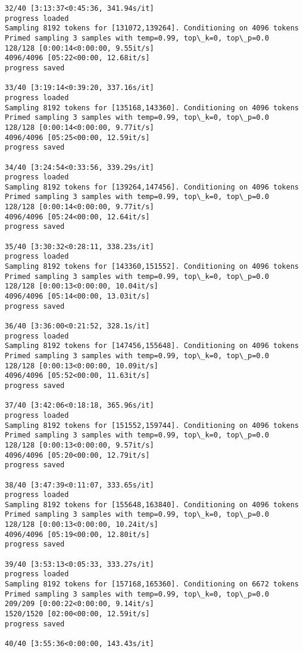 \documentclass[11pt]{article}
\begin{document}
\begin{Verbatim}[commandchars=\\\{\}]
32/40 [3:13:37<0:45:36, 341.94s/it]
progress loaded
Sampling 8192 tokens for [131072,139264]. Conditioning on 4096 tokens
Primed sampling 3 samples with temp=0.99, top\_k=0, top\_p=0.0
128/128 [0:00:14<0:00:00, 9.55it/s]
4096/4096 [05:22<00:00, 12.68it/s]
progress saved

33/40 [3:19:14<0:39:20, 337.16s/it]
progress loaded
Sampling 8192 tokens for [135168,143360]. Conditioning on 4096 tokens
Primed sampling 3 samples with temp=0.99, top\_k=0, top\_p=0.0
128/128 [0:00:14<0:00:00, 9.77it/s]
4096/4096 [05:25<00:00, 12.59it/s]
progress saved

34/40 [3:24:54<0:33:56, 339.29s/it]
progress loaded
Sampling 8192 tokens for [139264,147456]. Conditioning on 4096 tokens
Primed sampling 3 samples with temp=0.99, top\_k=0, top\_p=0.0
128/128 [0:00:14<0:00:00, 9.77it/s]
4096/4096 [05:24<00:00, 12.64it/s]
progress saved

35/40 [3:30:32<0:28:11, 338.23s/it]
progress loaded
Sampling 8192 tokens for [143360,151552]. Conditioning on 4096 tokens
Primed sampling 3 samples with temp=0.99, top\_k=0, top\_p=0.0
128/128 [0:00:13<0:00:00, 10.04it/s]
4096/4096 [05:14<00:00, 13.03it/s]
progress saved

36/40 [3:36:00<0:21:52, 328.1s/it]
progress loaded
Sampling 8192 tokens for [147456,155648]. Conditioning on 4096 tokens
Primed sampling 3 samples with temp=0.99, top\_k=0, top\_p=0.0
128/128 [0:00:13<0:00:00, 10.09it/s]
4096/4096 [05:52<00:00, 11.63it/s]
progress saved

37/40 [3:42:06<0:18:18, 365.96s/it]
progress loaded
Sampling 8192 tokens for [151552,159744]. Conditioning on 4096 tokens
Primed sampling 3 samples with temp=0.99, top\_k=0, top\_p=0.0
128/128 [0:00:13<0:00:00, 9.57it/s]
4096/4096 [05:20<00:00, 12.79it/s]
progress saved

38/40 [3:47:39<0:11:07, 333.65s/it]
progress loaded
Sampling 8192 tokens for [155648,163840]. Conditioning on 4096 tokens
Primed sampling 3 samples with temp=0.99, top\_k=0, top\_p=0.0
128/128 [0:00:13<0:00:00, 10.24it/s]
4096/4096 [05:19<00:00, 12.80it/s]
progress saved

39/40 [3:53:13<0:05:33, 333.27s/it]
progress loaded
Sampling 8192 tokens for [157168,165360]. Conditioning on 6672 tokens
Primed sampling 3 samples with temp=0.99, top\_k=0, top\_p=0.0
209/209 [0:00:22<0:00:00, 9.14it/s]
1520/1520 [02:00<00:00, 12.59it/s]
progress saved

40/40 [3:55:36<0:00:00, 143.43s/it]
    \end{Verbatim}
\end{document}
